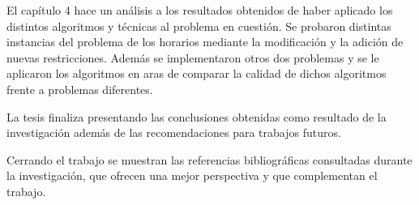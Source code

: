 \begin{introduction}
El cap\'itulo 4 hace un an\'alisis a los resultados obtenidos de haber aplicado los distintos algoritmos y t\'ecnicas al problema en cuesti\'on. Se probaron distintas instancias del problema de los horarios mediante la modificaci\'on y la adici\'on de nuevas restricciones. Adem\'as se implementaron otros dos problemas y se le aplicaron los algoritmos en aras de comparar la calidad de dichos algoritmos frente a problemas diferentes.

La tesis finaliza presentando las conclusiones obtenidas como resultado de la investigación además de las recomendaciones para trabajos futuros.

Cerrando el trabajo se muestran las referencias bibliográficas consultadas durante la investigación, que ofrecen una mejor perspectiva y que complementan el trabajo.

\end{introduction}
